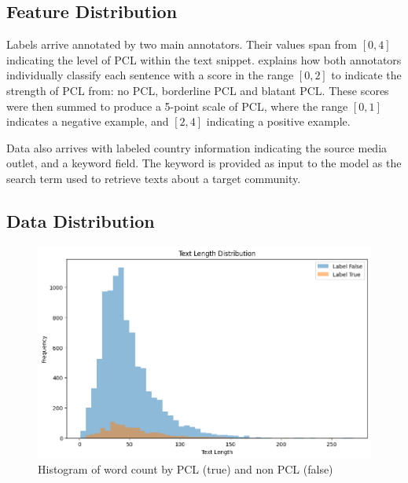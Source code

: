 \documentclass[11pt,a4paper]{article}
\begin{document}


\subsection{Feature Distribution}\label{sect:feature-distribution}

Labels arrive annotated by two main annotators. Their values span from $[0,4]$ indicating the level of PCL within the text snippet. \citet{perez-almendros-etal-2020-dont} explains how both annotators individually classify each sentence with a score in the range $[0,2]$ to indicate the strength of PCL from: no PCL, borderline PCL and blatant PCL. These scores were then summed to produce a 5-point scale of PCL, where the range $[0,1]$ indicates a negative example, and $[2,4]$ indicating a positive example.

Data also arrives with labeled country information indicating the source media outlet, and a keyword field. The keyword is provided as input to the model as the search term used to retrieve texts about a target community.

\subsection{Data Distribution}


\begin{figure}[!h]
    \centering
    \includegraphics[trim=0cm 0cm 0cm .8cm, clip, width=\linewidth]{figures/text-input-length-by-binary-patronizing.png}
    \caption{Histogram of word count by PCL (true) and non PCL (false)\footnotemark}
    \label{fig:word-count}
\end{figure}
\end{document}
